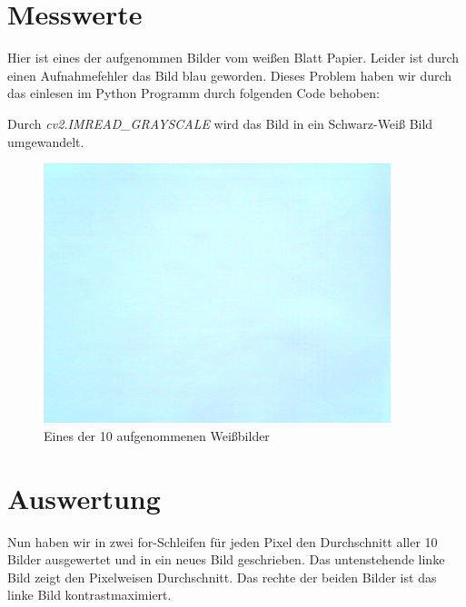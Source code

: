 \documentclass[12pt, oneside, a4paper, \docLanguage]{report}
\begin{document}
\section{Messwerte}
\label{chap:VERSUCH_3_MESSWERTE}
Hier ist eines der aufgenommen Bilder vom weißen Blatt Papier.
Leider ist durch einen Aufnahmefehler das Bild blau geworden. Dieses Problem haben wir durch das einlesen im Python Programm durch folgenden Code behoben:
\newline
\newline

\newline
\newline 
Durch \textit{cv2.IMREAD\_GRAYSCALE} wird das Bild in ein Schwarz-Weiß Bild umgewandelt.
\newline
\newline
\begin{figure}[hbt!]
	\centering\small
	\includegraphics[width=0.9\textwidth]{../data/white1.png}
	\caption{Eines der 10 aufgenommenen Weißbilder}
	\label{fig:Eines der 10 aufgenommenen Weißbilder}
\end{figure}
\newpage
\section{Auswertung}
\label{chap:VERSUCH_3_AUSWERTUNG}
Nun haben wir in zwei for-Schleifen für jeden Pixel den Durchschnitt aller 10 Bilder ausgewertet und in ein neues Bild geschrieben.
Das untenstehende linke Bild zeigt den Pixelweisen Durchschnitt. 
Das rechte der beiden Bilder ist das linke Bild kontrastmaximiert.
\end{document}
